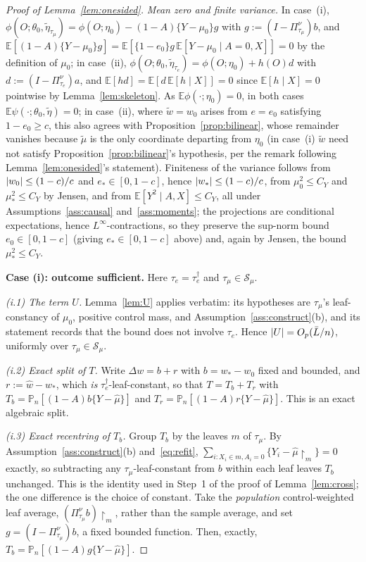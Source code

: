 \documentclass[11pt]{article}
\theoremstyle{plain}
\theoremstyle{definition}
\theoremstyle{remark}
\newcommand{\E}{\mathbb{E}}
\newcommand{\Pn}{\mathbb{P}_n}
\newcommand{\cS}{\mathcal{S}}
\newcommand{\ez}{e_0}
\newcommand{\mz}{\mu_0}
\newcommand{\wz}{w_0}
\newcommand{\mhat}{\widehat{\mu}}
\newcommand{\what}{\widehat{w}}
\DeclarePairedDelimiter{\abs}{\lvert}{\rvert}
\newcommand{\etatil}{\widetilde{\eta}}
\newcommand{\wtil}{\widetilde{w}}
\newcommand{\mtil}{\widetilde{\mu}}
\begin{document}
\begin{proof}[Proof of Lemma~\ref{lem:onesided}]
\emph{Mean zero and finite variance.} In case~(i),
$\phi(O;\theta_0,\etatil_{\tau_\mu})
=\phi(O;\eta_0)-(1-A)\{Y-\mz\}g$ with
$g:=(I-\Pi^\nu_{\tau_\mu})b$, and
$\E[(1-A)\{Y-\mz\}g]=\E[\{1-\ez\}g\,\E[Y-\mz\mid A=0,X]]=0$ by the definition of
$\mz$; in case~(ii),
$\phi(O;\theta_0,\etatil_{\tau_e})=\phi(O;\eta_0)+h(O)d$ with
$d:=(I-\Pi^\nu_{\tau_e})a$, and $\E[hd]=\E[d\,\E[h\mid X]]=0$ since
$\E[h\mid X]=0$ pointwise by Lemma~\ref{lem:skeleton}. As
$\E\phi(\cdot;\eta_0)=0$, in both cases $\E\psi(\cdot;\theta_0,\etatil)=0$; in
case~(ii), where $\wtil=\wz$ arises from $e=\ez$ satisfying $1-\ez\ge c$, this
also agrees with Proposition~\ref{prop:bilinear}, whose remainder vanishes
because $\mtil$ is the only coordinate departing from $\eta_0$ (in case~(i)
$\wtil$ need not satisfy Proposition~\ref{prop:bilinear}'s hypothesis, per the
remark following Lemma~\ref{lem:onesided}'s statement). Finiteness of
the variance follows from $\abs{\wz}\le(1-c)/c$ and $e_*\in[0,1-c]$, hence
$\abs{w_*}\le(1-c)/c$, from $\mz^2\le C_Y$ and $\mu_*^2\le C_Y$ by Jensen, and
from $\E[Y^2\mid A,X]\le C_Y$, all under
Assumptions~\ref{ass:causal} and~\ref{ass:moments}; the projections are
conditional expectations, hence $L^\infty$-contractions, so they preserve the
sup-norm bound $\ez\in[0,1-c]$ (giving $e_*\in[0,1-c]$ above) and, again by
Jensen, the bound $\mu_*^2\le C_Y$.

\medskip
\noindent\textbf{Case (i): outcome sufficient.} Here $\tau_e=\tau^\dagger_e$ and
$\tau_\mu\in\cS_\mu$.

\emph{(i.1) The term $U$.} Lemma~\ref{lem:U} applies verbatim: its hypotheses
are $\tau_\mu$'s leaf-constancy of $\mz$, positive control mass, and
Assumption~\ref{ass:construct}(b), and its statement records that the bound does
not involve $\tau_e$. Hence $\abs U=O_p(\bar L/n)$, uniformly over
$\tau_\mu\in\cS_\mu$.

\emph{(i.2) Exact split of $T$.} Write $\Delta w=b+r$ with $b=w_*-\wz$ fixed and
bounded, and $r:=\what-w_*$, which \emph{is} $\tau^\dagger_e$-leaf-constant, so
that
$T=T_b+T_r$ with
$T_b=\Pn[(1-A)b\{Y-\mhat\}]$ and $T_r=\Pn[(1-A)r\{Y-\mhat\}]$. This is an exact
algebraic split.

\emph{(i.3) Exact recentring of $T_b$.} Group $T_b$ by the leaves $m$ of
$\tau_\mu$. By Assumption~\ref{ass:construct}(b) and~\eqref{eq:refit},
$\sum_{i:X_i\in m,A_i=0}\{Y_i-\mhat\restriction_m\}=0$ exactly, so subtracting
any $\tau_\mu$-leaf-constant from $b$ within each leaf leaves $T_b$ unchanged.
This is the identity used in Step~1 of the proof of Lemma~\ref{lem:cross}; the
one difference is the choice of constant. Take the \emph{population}
control-weighted leaf average, $(\Pi^\nu_{\tau_\mu}b)\restriction_m$, rather
than the sample average, and set $g=(I-\Pi^\nu_{\tau_\mu})b$, a fixed bounded
function. Then, exactly,
$T_b=\Pn[(1-A)g\{Y-\mhat\}]$.


\end{proof}
\end{document}
